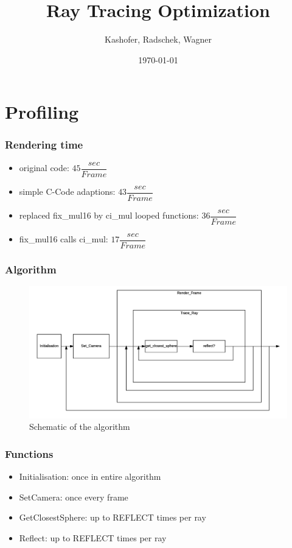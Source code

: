 \documentclass{beamer}
\title{Ray Tracing Optimization}
\author{Kashofer, Radschek, Wagner}
\date{\today}
\begin{document}
\maketitle
\frame{\tableofcontents[currentsection]}
 
\section{Profiling}
\begin{frame} %
	\frametitle{Rendering time} %
  	\begin{itemize}
		\item original code: $45 \dfrac{sec}{Frame}$
		\item simple C-Code adaptions: $43 \dfrac{sec}{Frame}$
		\item replaced fix\_mul16 by ci\_mul looped functions: $36 \dfrac{sec}{Frame}$
		\item fix\_mul16 calls ci\_mul: $17 \dfrac{sec}{Frame}$
	\end{itemize}

\end{frame}

\begin{frame} %
	\frametitle{Algorithm} %
  	\begin{figure}
		\includegraphics[width=\textwidth]{algo.png}
		\caption{Schematic of the algorithm}
	\label{fig1}
	\end{figure}
\end{frame}


\begin{frame} %
	\frametitle{Functions} %
  	\begin{itemize}
		\item Initialisation: once in entire algorithm
		\item SetCamera: once every frame
		\item GetClosestSphere: up to REFLECT times per ray
		\item Reflect: up to REFLECT times per ray
	\end{itemize}
\end{frame}
\end{document}
